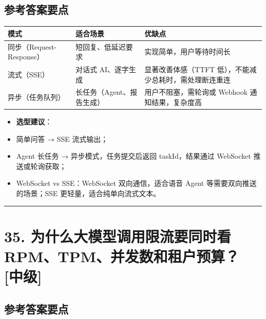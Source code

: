 \documentclass[9pt,a4paper,twocolumn]{ctexart}
\newcommand{\lvzhong}{\usebox{\badgezhongbox}}
\def\lvzhong{[中级]}%
\begin{document}
\subsection*{参考答案要点}

{\footnotesize
\begin{tabular}{|p{}|p{}|p{}|}
\hline
\textbf{模式} & \textbf{适合场景} & \textbf{优缺点} \\
\hline
同步（Request-Response） & 短回复、低延迟要求 & 实现简单，用户等待时间长 \\
\hline
流式（SSE） & 对话式 AI、逐字生成 & 显著改善体感（TTFT 低），不能减少总耗时，需处理断连重连 \\
\hline
异步（任务队列） & 长任务（Agent、报告生成） & 用户不阻塞，需轮询或 Webhook 通知结果，复杂度高 \\
\hline
\end{tabular}
}


\begin{itemize}[itemsep=1pt, topsep=2pt]
  \item \textbf{选型建议}：
  \item 简单问答 → SSE 流式输出；
  \item Agent 长任务 → 异步模式，任务提交后返回 taskId，结果通过 WebSocket 推送或轮询获取；
  \item WebSocket vs SSE：WebSocket 双向通信，适合语音 Agent 等需要双向推送的场景；SSE 更轻量，适合纯单向流式文本。
\end{itemize}


\vspace{2pt}
\noindent\rule{\columnwidth}{0.3pt}\vspace{2pt}



\section*{35. 为什么大模型调用限流要同时看 RPM、TPM、并发数和租户预算？ \lvzhong{}}


\subsection*{参考答案要点}
\end{document}
